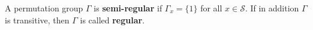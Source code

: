 A permutation group $\Gamma$ is \textbf{semi-regular} if $\Gamma_x = \{1\}$ for all $x \in \mathcal{S}$. If in addition $\Gamma$ is transitive, then $\Gamma$ is called \textbf{regular}.
